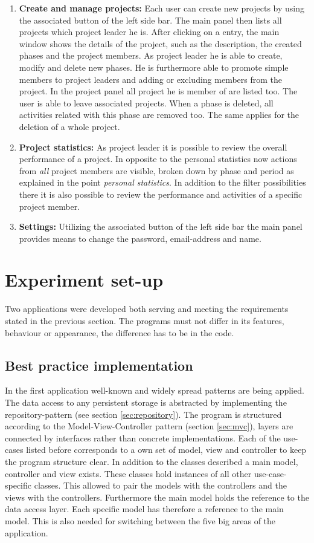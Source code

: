 \begin{enumerate}
\item \textbf{Create and manage projects:} Each user can create new projects by using the associated button of the left side bar. The main panel then lists all projects which project leader he is. After clicking on a entry, the main window shows the details of the project, such as the description, the created phases and the project members. As project leader he is able to create, modify and delete new phases. He is furthermore able to promote simple members to project leaders and adding or excluding members from the project. In the project panel all project he is member of are listed too. The user is able to leave associated projects. When a phase is deleted, all activities related with this phase are removed too. The same applies for the deletion of a whole project. 

\item \textbf{Project statistics:} As project leader it is possible to review the overall performance of a project. In opposite to the personal statistics now actions from \emph{all} project members are visible, broken down by phase and period as explained in the point \emph{personal statistics}. In addition to the filter possibilities there it is also possible to review the performance and activities of a specific project member.

\item \textbf{Settings:} Utilizing the associated button of the left side bar the main panel provides means to change the password, email-address and name.
\end{enumerate}

\section{Experiment set-up}
Two applications were developed both serving and meeting the requirements stated in the previous section. The programs must not differ in its features, behaviour or appearance, the difference has to be in the code. 
\subsection{Best practice implementation}
In the first application well-known and widely spread patterns are being applied. The data access to any persistent storage is abstracted by implementing the repository-pattern (see section \ref{sec:repository}). The program is structured according to the Model-View-Controller pattern (section \ref{sec:mvc}), layers are connected by interfaces rather than concrete implementations. Each of the use-cases listed before corresponds to a own set of model, view and controller to keep the program structure clear. In addition to the classes described a main model, controller and view exists. These classes hold instances of all other use-case-specific classes. This allowed to pair the models with the controllers and the views with the controllers. Furthermore the main model holds the reference to the data access layer. Each specific model has therefore a reference to the main model. This is also needed for switching between the five big areas of the application.

